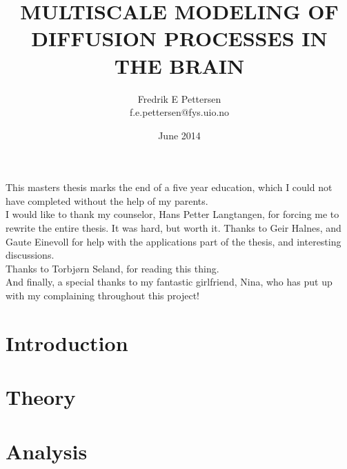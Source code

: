 \documentclass[twoside,english]{uiofysmaster}
\author{Fredrik E Pettersen\\ f.e.pettersen@fys.uio.no}
\title{\uppercase{Multiscale modeling of diffusion processes in the brain}}
\date{June 2014}
\begin{document}

\cleardoublepage



\begin{acknowledgements}
  This masters thesis marks the end of a five year education, which I could not have completed without the help of my parents.\\
  
  \noindent I would like to thank my counselor, Hans Petter Langtangen, for forcing me to rewrite the entire thesis. It was hard, but worth it. 
  Thanks to Geir Halnes, and Gaute Einevoll for help with the applications part of the thesis, and interesting discussions. \\
  
  Thanks to Torbjørn Seland, for reading this thing.\\
  
  And finally, a special thanks to my fantastic girlfriend, Nina, who has put up with my complaining throughout this project!
  
\end{acknowledgements}


\tableofcontents
\clearpage
\listoffigures

\clearpage
\printnomenclature


\chapter{Introduction}\label{chapter:introduction}
\clearpage


\chapter{Theory}\label{chapter:theory}
\clearpage


\chapter{Analysis}\label{chapter:analysis}
\clearpage

\end{document}
